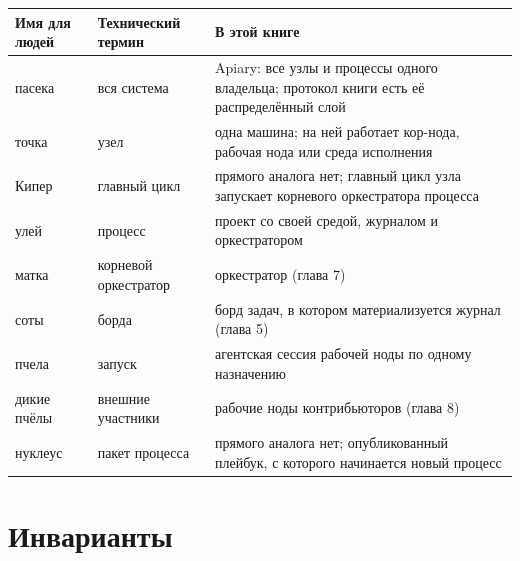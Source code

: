 \begin{center}
\small
\begin{tabular}{p{2.4cm} p{3.4cm} p{7.6cm}}
\toprule
Имя для людей & Технический термин & В этой книге \\
\midrule
пасека & вся система & Apiary: все узлы и процессы одного владельца; протокол книги есть её распределённый слой \\
точка & узел & одна машина; на ней работает кор-нода, рабочая нода или среда исполнения \\
Кипер & главный цикл & прямого аналога нет; главный цикл узла запускает корневого оркестратора процесса \\
улей & процесс & проект со своей средой, журналом и оркестратором \\
матка & корневой оркестратор & оркестратор (глава 7) \\
соты & борда & борд задач, в котором материализуется журнал (глава 5) \\
пчела & запуск & агентская сессия рабочей ноды по одному назначению \\
дикие пчёлы & внешние участники & рабочие ноды контрибьюторов (глава 8) \\
нуклеус & пакет процесса & прямого аналога нет; опубликованный плейбук, с которого начинается новый процесс \\
\bottomrule
\end{tabular}
\end{center}

\chapter{Инварианты}

